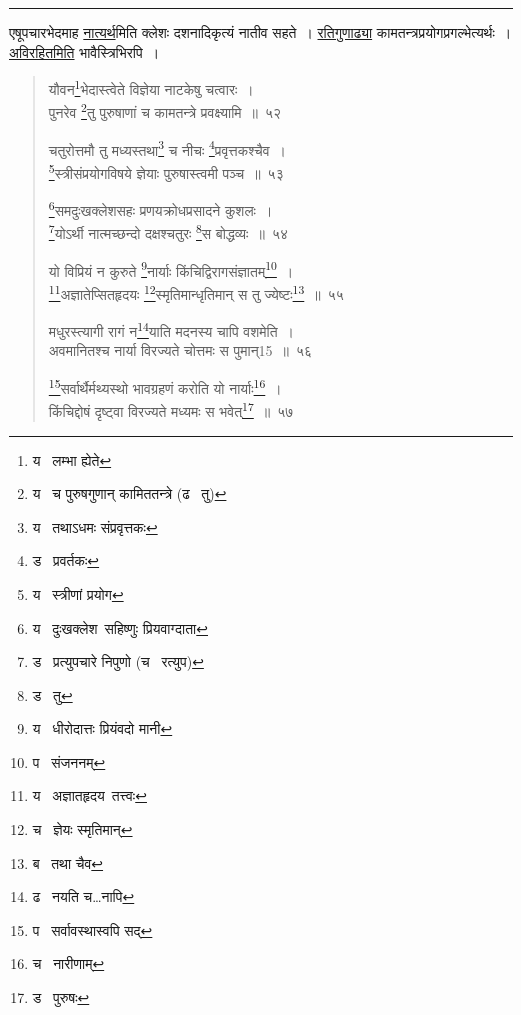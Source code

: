 \documentclass[11pt, openany]{book}
\begin{document}
\hrule

\vspace{2mm}
एषूपचारभेदमाह \underline{नात्यर्थ}मिति क्लेशः दशनादिकृत्यं नातीव सहते~। \underline{रतिगुणाढ्या} कामतन्त्रप्रयोगप्रगल्भेत्यर्थः~। \underline{अविरहितमिति} भावैस्त्रिभिरपि~।


\newpage
\lfoot{}

\begin{quote}
{\na यौवन\renewcommand{\thefootnote}{1}\footnote{य \textendash\  लम्भा ह्येते}भेदास्त्वेते विज्ञेया नाटकेषु चत्वारः~।\\
पुनरेव \renewcommand{\thefootnote}{2}\footnote{य \textendash\  च पुरुषगुणान् कामिततन्त्रे (ढ \textendash\  तु)}तु पुरुषाणां च कामतन्त्रे प्रवक्ष्यामि~॥~५२

चतुरोत्तमौ तु मध्यस्तथा\renewcommand{\thefootnote}{3}\footnote{य \textendash\  तथाऽधमः संप्रवृत्तकः} च नीचः \renewcommand{\thefootnote}{4}\footnote{ड \textendash\  प्रवर्तकः}प्रवृत्तकश्चैव~।\\
\renewcommand{\thefootnote}{5}\footnote{य \textendash\  स्त्रीणां प्रयोग}स्त्रीसंप्रयोगविषये ज्ञेयाः पुरुषास्त्वमी पञ्च~॥~५३

\renewcommand{\thefootnote}{6}\footnote{य \textendash\  दुःखक्लेश\textendash\ सहिष्णुः प्रियवाग्दाता}समदुःखक्लेशसहः प्रणयक्रोधप्रसादने कुशलः~।\\
\renewcommand{\thefootnote}{7}\footnote{ड \textendash\  प्रत्युपचारे निपुणो (च \textendash\  रत्युप)}योऽर्थी नात्मच्छन्दो दक्षश्चतुरः \renewcommand{\thefootnote}{8}\footnote{ड \textendash\  तु}स बोद्धव्यः~॥~५४

यो विप्रियं न कुरुते \renewcommand{\thefootnote}{9}\footnote{य \textendash\  धीरोदात्तः प्रियंवदो मानी}नार्याः किंचिद्विरागसंज्ञातम्\renewcommand{\thefootnote}{10}\footnote{प \textendash\  संजननम्}~।\\
\renewcommand{\thefootnote}{11}\footnote{य \textendash\  अज्ञातहृदय\textendash\ तत्त्वः}अज्ञातेप्सितहृदयः \renewcommand{\thefootnote}{12}\footnote{च \textendash\  ज्ञेयः स्मृतिमान्}स्मृतिमान्धृतिमान् स तु ज्येष्टः\renewcommand{\thefootnote}{13}\footnote{ब \textendash\  तथा चैव}~॥~५५

मधुरस्त्यागी रागं न\renewcommand{\thefootnote}{14}\footnote{ढ \textendash\  नयति च\ldots नापि}याति मदनस्य चापि वशमेति~।\\
अवमानितश्च नार्या विरज्यते चोत्तमः स पुमान्15~॥~५६

\renewcommand{\thefootnote}{16}\footnote{प \textendash\  सर्वावस्थास्वपि सद्}सर्वार्थैर्मथ्यस्थो भावग्रहणं करोति यो नार्याः\renewcommand{\thefootnote}{17}\footnote{च \textendash\  नारीणाम्}~।\\
किंचिद्दोषं दृष्ट्वा विरज्यते मध्यमः स भवेत्\renewcommand{\thefootnote}{18}\footnote{ड \textendash\  पुरुषः}~॥~५७}
\end{quote}
\end{document}
